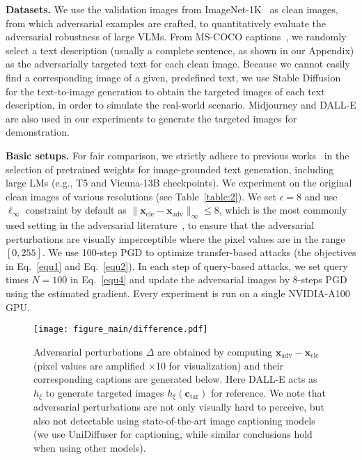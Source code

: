 \textbf{Datasets.} 
We use the validation images from ImageNet-1K~\citep{deng2009imagenet} as clean images, from which adversarial examples are crafted, to quantitatively evaluate the adversarial robustness of large VLMs. 
From MS-COCO captions~\citep{lin2014microsoft}, we randomly select a text description (usually a complete sentence, as shown in our Appendix) as the adversarially targeted text for each clean image. Because we cannot easily find a corresponding image of a given, predefined text, we use Stable Diffusion~\citep{rombach2022high} for the text-to-image generation to obtain the targeted images of each text description, in order to simulate the real-world scenario. 
Midjourney \citep{Midjourney} and DALL-E \citep{ramesh2021zero,ramesh2022hierarchical} are also used in our experiments to generate the targeted images for demonstration.

\textbf{Basic setups.} For fair comparison, we strictly adhere to previous works~\citep{bao2022one, guoimages,li2022blip, li2023blip,liu2023llava, zhu2023minigpt} in the selection of pretrained weights for image-grounded text generation, including large LMs (e.g., T5 \citep{raffel2020exploring} and Vicuna-13B \citep{chiang2023vicuna} checkpoints). We experiment on the original clean images of various resolutions (see Table~\ref{table:2}). We set $\epsilon=8$ and use $\ell_{\infty}$ constraint by default as ${\|\boldsymbol{x}_{\text{cle}}-\boldsymbol{x}_{\text{adv}}\|_{\infty}\leq}8$, which is the most commonly used setting in the adversarial literature~\citep{carlini2019evaluating}, to ensure that the adversarial perturbations are visually imperceptible where the pixel values are in the range $[0,255]$. We use 100-step PGD to optimize transfer-based attacks (the objectives in Eq.~\eqref{equ1} and Eq.~\eqref{equ2}). In each step of query-based attacks, we set query times $N=100$ in Eq.~\eqref{equ4} and update the adversarial images by 8-steps PGD using the estimated gradient. Every experiment is run on a single NVIDIA-A100 GPU.

\begin{figure*}[t]
    \centering
    \texttt{[image: figure\_main/difference.pdf]}
    \caption{
    Adversarial perturbations $\Delta$ are obtained by computing $\boldsymbol{x}_{\text{adv}}-\boldsymbol{x}_{\text{cle}}$ (pixel values are amplified $\times$10 for visualization) and their corresponding captions are generated below. Here DALL-E acts as $h_{\xi}$ to generate targeted images $h_{\xi}(\boldsymbol{c}_\text{tar})$ for reference. We note that adversarial perturbations are not only visually hard to perceive, but also not detectable using state-of-the-art image captioning models (we use UniDiffuser for captioning, while similar conclusions hold when using other models).
    }
    \label{fig:difference}
\end{figure*}


